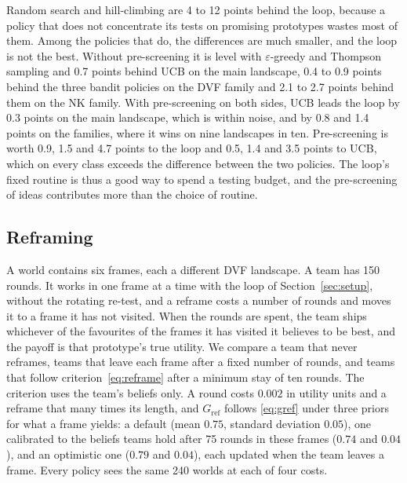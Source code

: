 \documentclass[preprint,review,11pt,authoryear]{elsarticle}
\theoremstyle{definition}
\begin{document}
Random search and hill-climbing are 4 to 12 points behind the loop, because a policy that does not concentrate its tests on promising prototypes wastes most of them. Among the policies that do, the differences are much smaller, and the loop is not the best. Without pre-screening it is level with $\varepsilon$-greedy and Thompson sampling and 0.7 points behind UCB on the main landscape, 0.4 to 0.9 points behind the three bandit policies on the DVF family and 2.1 to 2.7 points behind them on the NK family. With pre-screening on both sides, UCB leads the loop by 0.3 points on the main landscape, which is within noise, and by 0.8 and 1.4 points on the families, where it wins on nine landscapes in ten. Pre-screening is worth 0.9, 1.5 and 4.7 points to the loop and 0.5, 1.4 and 3.5 points to UCB, which on every class exceeds the difference between the two policies. The loop's fixed routine is thus a good way to spend a testing budget, and the pre-screening of ideas contributes more than the choice of routine.

\subsection{Reframing}
\label{sec:reframesim}

A world contains six frames, each a different DVF landscape. A team has 150 rounds. It works in one frame at a time with the loop of Section~\ref{sec:setup}, without the rotating re-test, and a reframe costs a number of rounds and moves it to a frame it has not visited. When the rounds are spent, the team ships whichever of the favourites of the frames it has visited it believes to be best, and the payoff is that prototype's true utility. We compare a team that never reframes, teams that leave each frame after a fixed number of rounds, and teams that follow criterion~\eqref{eq:reframe} after a minimum stay of ten rounds. The criterion uses the team's beliefs only. A round costs $0.002$ in utility units and a reframe that many times its length, and $G_{\mathrm{ref}}$ follows \eqref{eq:gref} under three priors for what a frame yields: a default (mean $0.75$, standard deviation $0.05$), one calibrated to the beliefs teams hold after 75 rounds in these frames ($0.74$ and $0.04$), and an optimistic one ($0.79$ and $0.04$), each updated when the team leaves a frame. Every policy sees the same 240 worlds at each of four costs.
\end{document}
